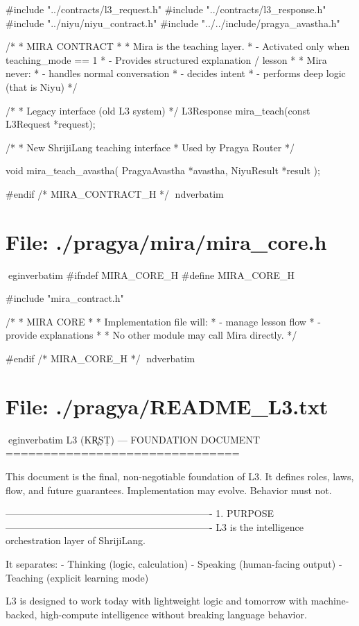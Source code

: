 \documentclass{article}
\begin{document}
#include "../contracts/l3_request.h"
#include "../contracts/l3_response.h"
#include "../niyu/niyu_contract.h"
#include "../../include/pragya_avastha.h"

/*
 * MIRA CONTRACT
 *
 * Mira is the teaching layer.
 * - Activated only when teaching_mode == 1
 * - Provides structured explanation / lesson
 *
 * Mira never:
 * - handles normal conversation
 * - decides intent
 * - performs deep logic (that is Niyu)
 */

/*
 * Legacy interface (old L3 system)
 */
L3Response mira_teach(const L3Request *request);

/*
 * New ShrijiLang teaching interface
 * Used by Pragya Router
 */

void mira_teach_avastha(
    PragyaAvastha *avastha,
    NiyuResult *result
);

#endif /* MIRA_CONTRACT_H */
nd{verbatim}
\section*{File: ./pragya/mira/mira_core.h}
egin{verbatim}
#ifndef MIRA_CORE_H
#define MIRA_CORE_H

#include "mira_contract.h"

/*
 * MIRA CORE
 *
 * Implementation file will:
 * - manage lesson flow
 * - provide explanations
 *
 * No other module may call Mira directly.
 */

#endif /* MIRA_CORE_H */
nd{verbatim}
\section*{File: ./pragya/README_L3.txt}
egin{verbatim}
L3 (KR̥ṢṬ) — FOUNDATION DOCUMENT
===============================

This document is the final, non-negotiable foundation of L3.
It defines roles, laws, flow, and future guarantees.
Implementation may evolve. Behavior must not.

----------------------------------------------------------------
1. PURPOSE
----------------------------------------------------------------
L3 is the intelligence orchestration layer of ShrijiLang.

It separates:
- Thinking (logic, calculation)
- Speaking (human-facing output)
- Teaching (explicit learning mode)

L3 is designed to work today with lightweight logic
and tomorrow with machine-backed, high-compute intelligence
without breaking language behavior.
\end{document}
